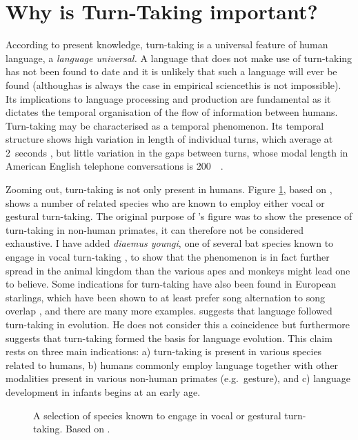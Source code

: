 \section{Why is Turn-Taking important?}
\label{sec:intrott}
According to present knowledge, turn-taking is a universal feature of human language, a \emph{language universal.}
A language that does not make use of turn-taking has not been found to date and it is unlikely that such a language will ever be found (although\dash as is always the case in empirical science\dash this is not impossible).
Its implications to language processing and production are fundamental as it dictates the temporal organisation of the flow of information between humans.
Turn-taking may be characterised as a temporal phenomenon.
Its temporal structure shows high variation in length of individual turns, which average at 2~seconds \citep[]{levinson_turn-taking_2016}, but little variation in the gaps between turns, whose modal length in American English telephone conversations is 200~\ms\ \citep[]{levinson_timing_2015}.

Zooming out, turn-taking is not only present in humans.
Figure \ref{fig:species}, based on \citet[]{levinson_turn-taking_2016}, shows a number of related species who are known to employ either vocal or gestural turn-taking.
The original purpose of \citeauthor{levinson_turn-taking_2016}'s figure was to show the presence of turn-taking in non-human primates, it can therefore not be considered exhaustive.
I have added \emph{diaemus youngi}, one of several bat species known to engage in vocal turn-taking \citep[]{vernes_what_2017}, to show that the phenomenon is in fact further spread in the animal kingdom than the various apes and monkeys might lead one to believe.
Some indications for turn-taking have also been found in European starlings, which have been shown to at least prefer song alternation to song overlap \citep{henry_social_2015}, and there are many more examples.
\citet[]{levinson_turn-taking_2016} suggests that language followed turn-taking in evolution. He does not consider this a coincidence but furthermore suggests that turn-taking formed the basis for language evolution.
This claim rests on three main indications: a) turn-taking is present in various species related to humans, b) humans commonly employ language together with other modalities present in various non-human primates (e.g.~gesture), and c) language development in infants begins at an early age.

\begin{figure}
	\centering
	
	\label{fig:species}
	\caption[Species known to engage in vocal or gestural turn-taking.]{A selection of species known to engage in vocal or gestural turn-taking. Based on \citet[]{levinson_turn-taking_2016}.}
\end{figure}

